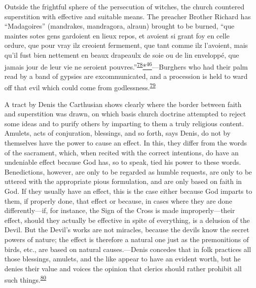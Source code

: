 Outside the frightful sphere of the persecution of witches, the church
countered superstition with effective and suitable means. The preacher
Brother Richard has ``Madagoires'' (mandrakes, mandragora, alraun)
brought to be burned, ``que maintes sotes gens gardoient en lieux repos,
et avoient si grant foy en celle ordure, que pour vray ilz creoient
fermement, que tant comme ilz l'avoient, mais qu'il fust bien nettement
en beaux drapeaulx de soie ou de lin enveloppé, que jamais jour de leur
vie ne seroient
pouvres.''\textsuperscript{\protect\hypertarget{18_Chapter_Eleven__THE_FORMS_OF_THO.xhtmlux5cux23id_478}{\protect\hyperlink{23_NOTES.xhtmlux5cux23id_479}{78}}}\protect\hypertarget{18_Chapter_Eleven__THE_FORMS_OF_THO.xhtmlux5cux23id_2653}{\protect\hyperlink{23_NOTES.xhtmlux5cux23id_2654}{*\textsuperscript{46}}}---Burghers
who had their palm read by a band of gypsies are excommunicated, and a
procession is held to ward off that evil which could come from
godlessness.\textsuperscript{\protect\hypertarget{18_Chapter_Eleven__THE_FORMS_OF_THO.xhtmlux5cux23id_476}{\protect\hyperlink{23_NOTES.xhtmlux5cux23id_477}{79}}}

A tract by Denis the Carthusian shows clearly where the border between
faith and superstition was drawn, on which basis church doctrine
attempted to reject some ideas and to purify others by imparting to them
a truly religious content. Amulets, acts of conjuration, blessings, and
so forth, says Denis, do not by themselves have the power to cause an
effect. In this, they differ from the
\protect\hypertarget{18_Chapter_Eleven__THE_FORMS_OF_THO.xhtmlux5cux23page_293}{}{}words
of the sacrament, which, when recited with the correct intentions, do
have an undeniable effect because God has, so to speak, tied his power
to these words. Benedictions, however, are only to be regarded as humble
requests, are only to be uttered with the appropriate pious formulation,
and are only based on faith in God. If they usually have an effect, this
is the case either because God imparts to them, if properly done, that
effect or because, in cases where they are done differently---if, for
instance, the Sign of the Cross is made improperly---their effect,
should they actually be effective in spite of everything, is a delusion
of the Devil. But the Devil's works are not miracles, because the devils
know the secret powers of nature; the effect is therefore a natural one
just as the premonitions of birds, etc., are based on natural
causes.---Denis concedes that in folk practices all those blessings,
amulets, and the like appear to have an evident worth, but he denies
their value and voices the opinion that clerics should rather prohibit
all such
things.\textsuperscript{\protect\hypertarget{18_Chapter_Eleven__THE_FORMS_OF_THO.xhtmlux5cux23id_474}{\protect\hyperlink{23_NOTES.xhtmlux5cux23id_475}{80}}}

